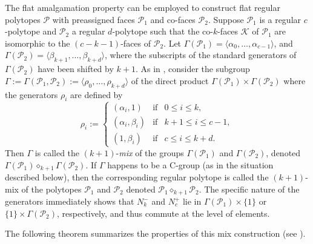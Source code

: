\documentclass[12pt]{amsart}
\theoremstyle{definition}
\begin{document}
The flat amalgamation property can be employed to construct flat regular polytopes $\mathcal{P}$ with preassigned faces $\mathcal{P}_{1}$ and co-faces $\mathcal{P}_{2}$.
Suppose $\mathcal{P}_{1}$ is a regular $c$-polytope and $\mathcal{P}_{2}$ a regular $d$-polytope such that the co-$k$-faces $\mathcal{K}$ of $\mathcal{P}_{1}$ are isomorphic to the $(c-k-1)$-faces of $\mathcal{P}_{2}$. Let $\Gamma(\mathcal{P}_{1}) = \langle\alpha_{0},\ldots,\alpha_{c-1}\rangle$, and $\Gamma(\mathcal{P}_{2}) = \langle\beta_{k+1},\ldots,\beta_{k+d}\rangle$, where the subscripts of the standard generators of $\Gamma(\mathcal{P}_{2})$ have been shifted by $k+1$. As in \cite[4F5]{McMSch2002}, consider the subgroup 
$\Gamma := \Gamma(\mathcal{P}_{1},\mathcal{P}_{2}) := \langle\rho_0,\ldots,\rho_{k+d}\rangle$ of the direct product $\Gamma(\mathcal{P}_{1}) \times \Gamma(\mathcal{P}_{2})$ where the generators $\rho_i$ are defined by
\begin{equation}
\label{flatamalgen}
\rho_{i} := \left\{  
\begin{array}{lcl}
(\alpha_{i},1) & \mbox{if} & 0 \leq i \leq k,  \\
(\alpha_{i},\beta_{i}) & \mbox{if} & k+1 \leq i \leq c-1,  \\
(1,\beta_{i}) & \mbox{if} & c \leq i \leq k+d.
\end{array}  \right.
\end{equation}
Then $\Gamma$ is called the $(k+1)$-{\it mix\/} of the groups $\Gamma(\mathcal{P}_{1})$ and $\Gamma(\mathcal{P}_{2})$, denoted $\Gamma(\mathcal{P}_{1})\!\diamond_{k+1}\!\Gamma(\mathcal{P}_{2})$. If $\Gamma$ happens to be a C-group (as in the situation described below), then the corresponding regular polytope is called the $(k+1)$-mix of the polytopes $\mathcal{P}_1$ and $\mathcal{P}_2$ denoted $\mathcal{P}_{1}\!\diamond_{k+1}\!\mathcal{P}_{2}$.
The specific nature of the generators immediately shows that $N_{k}^{-}$ and $N_{c}^{+}$ lie in $\Gamma(\mathcal{P}_{1})\times\{1\}$ or $\{1\}\times\Gamma(\mathcal{P}_{2})$, respectively, and thus commute at the level of elements.

The following theorem summarizes the properties of this mix construction (see \cite[Thm. 4F9]{McMSch2002}). 
\end{document}

